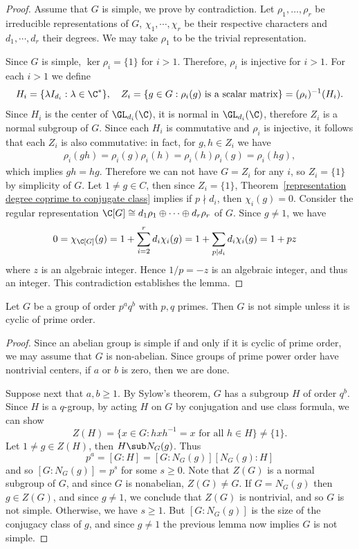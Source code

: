 \begin{proof}
Assume that $G$ is simple, we prove by contradiction. Let $\rho_1,\dots,\rho_r$ be irreducible representations of $G$, $\chi_1,\cdots,\chi_r$ be their respective characters and $d_1,\cdots,d_r$ their degrees. We may take $\rho_1$ to be the trivial representation.\par 
Since $G$ is simple, $\ker\rho_i=\{1\}$ for $i>1$. Therefore, $\rho_i$ is injective for $i>1$. For each $i>1$ we define
\[H_i=\{\lambda I_{d_i}:\lambda\in\C^*\},\quad Z_i=\{g\in G:\text{$\rho_i(g)$ is a scalar matrix}\}=(\rho_i)^{-1}(H_i).\] 
Since $H_i$ is the center of $\GL_{d_i}(\C)$, it is normal in $\GL_{d_i}(\C)$, therefore $Z_i$ is a normal subgroup of $G$. Since each $H_i$ is commutative and $\rho_i$ is injective, it follows that each $Z_i$ is also commutative: in fact, for $g,h\in Z_i$ we have
\begin{align*}
\rho_i(gh)=\rho_i(g)\rho_i(h)=\rho_i(h)\rho_i(g)=\rho_i(hg),
\end{align*}
which implies $gh=hg$. Therefore we can not have $G=Z_i$ for any $i$, so $Z_i=\{1\}$ by simplicity of $G$. Let $1\neq g\in C$, then since $Z_i=\{1\}$, Theorem~\ref{representation degree coprime to conjugate class} implies if $p\nmid d_i$, then $\chi_i(g)=0$. Consider the regular representation $\C[G]\cong d_1\rho_1\oplus\cdots\oplus d_r\rho_r$ of $G$. Since $g\neq 1$, we have
\begin{align*}
0&=\chi_{\C[G]}(g)=1+\sum_{i=2}^{r}d_i\chi_i(g)=1+\sum_{p\mid d_i}d_i\chi_i(g)=1+pz
\end{align*}
where $z$ is an algebraic integer. Hence $1/p=-z$ is an algebraic integer, and thus an integer. This contradiction establishes the lemma.
\end{proof}
\begin{theorem}\label{Burnside p^aq^b}
Let $G$ be a group of order $p^aq^b$ with $p,q$ primes. Then $G$ is not simple unless it is cyclic of prime order.
\end{theorem}
\begin{proof}
Since an abelian group is simple if and only if it is cyclic of prime order, we may assume that $G$ is non-abelian. Since groups of prime power order have nontrivial centers, if $a$ or $b$ is zero, then we are done.\par
Suppose next that $a,b\geq 1$. By Sylow's theorem, $G$ has a subgroup $H$ of order $q^b$. Since $H$ is a $q$-group, by acting $H$ on $G$ by conjugation and use class formula, we can show 
\[Z(H)=\{x\in G:hxh^{-1}=x\text{ for all $h\in H$}\}\neq\{1\}.\]
Let $1\neq g\in Z(H)$, then $H\sub N_G(g)$. Thus
\[p^a=[G:H]=[G:N_G(g)][N_G(g):H]\]
and so $[G:N_G(g)]=p^s$ for some $s\geq0$. Note that $Z(G)$ is a normal subgroup of $G$, and since $G$ is nonabelian, $Z(G)\neq G$. If $G=N_G(g)$ then $g\in Z(G)$, and since $g\neq 1$, we conclude that $Z(G)$ is nontrivial, and so $G$ is not simple. Otherwise, we have $s\geq 1$. But $[G:N_G(g)]$ is the size of the conjugacy class of $g$, and since $g\neq 1$ the previous lemma now implies $G$ is not simple.
\end{proof}
